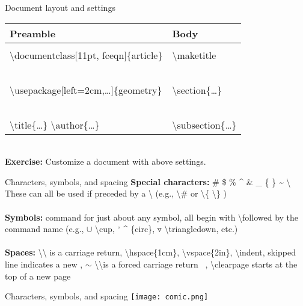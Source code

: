 \documentclass[xcolor=dvipsnames]{beamer}
\begin{document}
\begin{frame}{\LARGE{Document layout and settings}}
\begin{tabular}{l|l}
 \textbf{Preamble} & \textbf{Body}\\
\hline
 & \\
\textbackslash documentclass[11pt, fceqn]\{article\} & \textbackslash maketitle\\~\\
\textbackslash usepackage[left=2cm,\dots]\{geometry\} &  \textbackslash section\{\dots\}\\~\\
\textbackslash title\{\dots\} \textbackslash author\{\dots\}  & \textbackslash subsection\{\dots\}\\
\hline
\end{tabular}
~\\[1.5cm]\Large{\textbf{Exercise:} Customize a document with above settings.}
\end{frame}


\begin{frame}{\LARGE{Characters, symbols, and spacing}}
\textbf{Special characters:} \# \$ \% \^{} \& \_ \{ \} \~{} \textbackslash ~\\
\hspace{.5cm} These can all be used if preceded by a \textbackslash \hspace{.2cm}  (e.g., \textbackslash \# or \textbackslash \{ \textbackslash\} ) ~\\~\\
\textbf{Symbols:} command for just about any symbol, all begin with  \textbackslash followed by the command name (e.g., $\cup$ \textbackslash cup, $^{\circ}$ \^{} \{circ\}, $\triangledown$ \textbackslash triangledown, etc.)~\\~\\

\textbf{Spaces:} \textbackslash\textbackslash \hspace{.5mm} is a carriage return, \textbackslash hspace\{1cm\}, \textbackslash vspace\{2in\}, \textbackslash indent, skipped line indicates a new \textparagraph, $\sim$ \textbackslash \textbackslash is a forced carriage return ~, \textbackslash clearpage starts at the top of a new page\\

\end{frame}

\begin{frame}{\LARGE{Characters, symbols, and spacing}}
\centering
\texttt{[image: comic.png]}
\end{frame}
\end{document}
